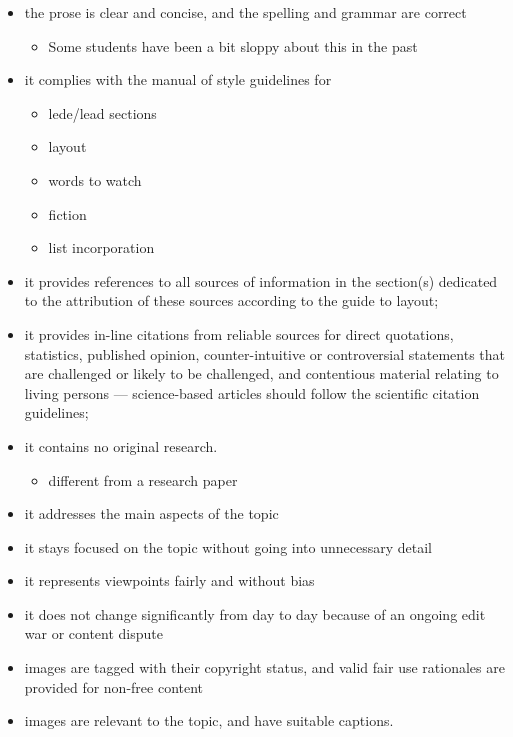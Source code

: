 \documentclass[a4paper,landscape,headrule,footrule,xetex]{foils}
\begin{document}

\begin{itemize}
\item  the prose is clear and concise, and the spelling and grammar are correct
  \begin{itemize}
  \item Some students have been a bit sloppy about this in the past
  \end{itemize}
\item  it complies with the manual of style guidelines for 
  \begin{itemize}
  \item lede/lead sections
  \item layout
  \item words to watch
  \item fiction
  \item list incorporation
  \end{itemize}
\end{itemize}


\begin{itemize}
\item  it provides references to all sources of information in the section(s) dedicated to the attribution of these sources according to the guide to layout;
\item  it provides in-line citations from reliable sources for direct quotations, statistics, published opinion, counter-intuitive or controversial statements that are challenged or likely to be challenged, and contentious material relating to living persons
--- science-based articles should follow the scientific citation guidelines;
\item it contains no original research.
  \begin{itemize}
  \item different from a research paper
  \end{itemize}
\end{itemize}

\begin{itemize}
\item  it addresses the main aspects of the topic
\item  it stays focused on the topic without going into unnecessary detail
\end{itemize}

\begin{itemize}
\item  it represents viewpoints fairly and without bias
\item it does not change significantly from day to day because of an ongoing edit war or content dispute
\item  images are tagged with their copyright status, and valid fair use rationales are provided for non-free content
\item  images are relevant to the topic, and have suitable captions.
\end{itemize}
\end{document}
